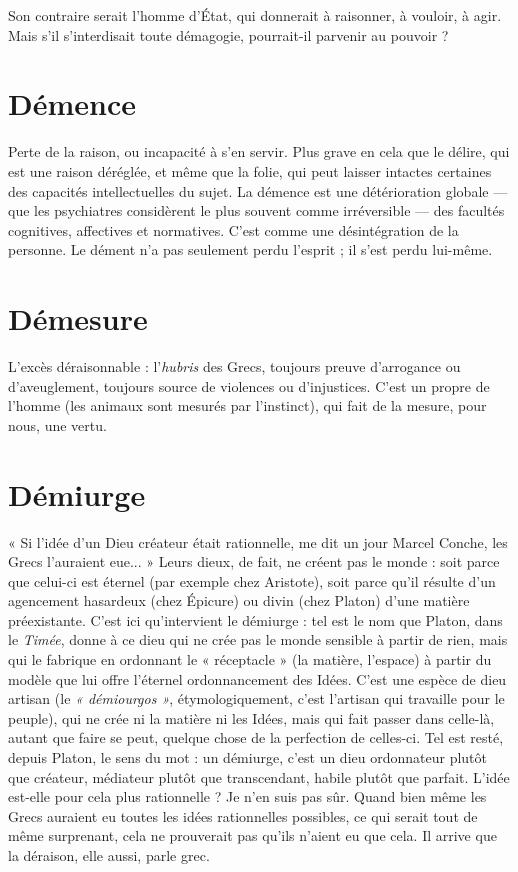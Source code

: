 Son contraire serait l’homme d’État, qui donnerait à raisonner, à vouloir, à
agir. Mais s’il s’interdisait toute démagogie, pourrait-il parvenir au pouvoir ?

\section{Démence}
Perte de la raison, ou incapacité à s’en servir. Plus grave en cela
que le délire, qui est une raison déréglée, et même que la folie,
qui peut laisser intactes certaines des capacités intellectuelles du sujet. La
démence est une détérioration globale — que les psychiatres considèrent le plus
souvent comme irréversible — des facultés cognitives, affectives et normatives.
C’est comme une désintégration de la personne. Le dément n’a pas seulement
perdu l'esprit ; il s’est perdu lui-même.

\section{Démesure}
L’excès déraisonnable : l’{\it hubris} des Grecs, toujours preuve d’arrogance
ou d’aveuglement, toujours source de violences ou
d’injustices. C’est un propre de l’homme (les animaux sont mesurés par l’instinct),
qui fait de la mesure, pour nous, une vertu.

\section{Démiurge}
« Si l’idée d’un Dieu créateur était rationnelle, me dit un jour
Marcel Conche, les Grecs l’auraient eue... » Leurs dieux, de
fait, ne créent pas le monde : soit parce que celui-ci est éternel (par exemple
chez Aristote), soit parce qu’il résulte d’un agencement hasardeux (chez Épicure)
ou divin (chez Platon) d’une matière préexistante. C’est ici qu’intervient
le démiurge : tel est le nom que Platon, dans le {\it Timée}, donne à ce dieu qui ne
crée pas le monde sensible à partir de rien, mais qui le fabrique en ordonnant
le « réceptacle » (la matière, l’espace) à partir du modèle que lui offre l’éternel
ordonnancement des Idées. C’est une espèce de dieu artisan (le {\it « démiourgos »},
étymologiquement, c’est l'artisan qui travaille pour le peuple), qui ne crée ni la
matière ni les Idées, mais qui fait passer dans celle-là, autant que faire se peut,
quelque chose de la perfection de celles-ci. Tel est resté, depuis Platon, le sens
du mot : un démiurge, c’est un dieu ordonnateur plutôt que créateur, médiateur
plutôt que transcendant, habile plutôt que parfait. L'idée est-elle pour cela
plus rationnelle ? Je n’en suis pas sûr. Quand bien même les Grecs auraient eu
toutes les idées rationnelles possibles, ce qui serait tout de même surprenant,
cela ne prouverait pas qu’ils n’aient eu que cela. Il arrive que la déraison, elle
aussi, parle grec.


